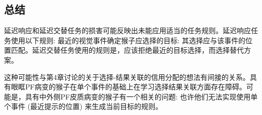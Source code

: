 \subsection{总结}
延迟响应和延迟交替任务的损害可能反映出未能应用适当的任务规则。延迟响应任务使用以下规则: 最近的视觉事件确定猴子应选择的目标: 其选择应与该事件的位置匹配。延迟交替任务使用的规则是，应该拒绝最近的目标选择，而选择替代方案。

这种可能性与第4章讨论的关于选择-结果关联的信用分配的想法有间接的关系。具有眼眶PF病变的猴子在单个事件的基础上在学习选择结果关联方面存在障碍。可能是，具有中外侧PF皮质病变的猴子有一个相关的问题: 也许他们无法实现使用单个事件 (最近提示的位置) 来生成当前目标的规则。



